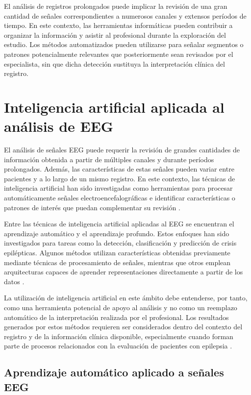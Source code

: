 El análisis de registros prolongados puede implicar la revisión de una gran
cantidad de señales correspondientes a numerosos canales y extensos períodos
de tiempo. En este contexto, las herramientas informáticas pueden contribuir
a organizar la información y asistir al profesional durante la exploración
del estudio. Los métodos automatizados pueden utilizarse para señalar
segmentos o patrones potencialmente relevantes que posteriormente sean
revisados por el especialista, sin que dicha detección sustituya la
interpretación clínica del registro.

\section{Inteligencia artificial aplicada al análisis de EEG}
\label{sec:ia-analisis-eeg}

El análisis de señales EEG puede requerir la revisión de grandes cantidades
de información obtenida a partir de múltiples canales y durante períodos
prolongados. Además, las características de estas señales pueden variar entre
pacientes y a lo largo de un mismo registro. En este contexto, las técnicas
de inteligencia artificial han sido investigadas como herramientas para
procesar automáticamente señales electroencefalográficas e identificar
características o patrones de interés que puedan complementar su revisión
\citep{Ahmad2022EEGMachineLearning}.

Entre las técnicas de inteligencia artificial aplicadas al EEG se
encuentran el aprendizaje automático y el aprendizaje profundo.
Estos enfoques han sido investigados para tareas como la detección,
clasificación y predicción de crisis epilépticas. Algunos métodos
utilizan características obtenidas previamente mediante técnicas
de procesamiento de señales, mientras que otros emplean
arquitecturas capaces de aprender representaciones directamente
a partir de los datos \citep{Ahmad2022EEGMachineLearning}.

La utilización de inteligencia artificial en este ámbito debe entenderse,
por tanto, como una herramienta potencial de apoyo al análisis y no como un
reemplazo automático de la interpretación realizada por el profesional. Los
resultados generados por estos métodos requieren ser considerados dentro del
contexto del registro y de la información clínica disponible, especialmente
cuando forman parte de procesos relacionados con la evaluación de pacientes
con epilepsia \citep{Ahmad2022EEGMachineLearning}.

\subsection{Aprendizaje automático aplicado a señales EEG}
\label{subsec:aprendizaje-automatico-eeg}

